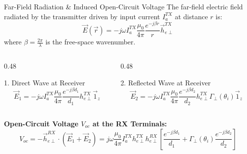 \documentclass[aspectratio=169, 10pt]{beamer}
\begin{document}
\begin{frame}{Far-Field Radiation \& Induced Open-Circuit Voltage}
    The far-field electric field radiated by the transmitter driven by input current $I_a^{TX}$ at distance $r$ is:
    \begin{equation}
        \vec{E}(\vec{r}) = -j\omega I_a^{TX} \frac{\mu_0}{4\pi} \frac{e^{-j\beta r}}{r} \vec{h}_{e\perp}^{TX}
    \end{equation}
    where $\beta = \frac{2\pi}{\lambda}$ is the free-space wavenumber.

    \begin{columns}[T]
        \begin{column}{0.48\textwidth}
            \begin{block}{1. Direct Wave at Receiver}
                \begin{equation}
                    \vec{E}_1 = -j\omega I_a^{TX} \frac{\mu_0}{4\pi} \frac{e^{-j\beta d_1}}{d_1} h_{e\perp}^{TX} \vec{1}_z
                \end{equation}
            \end{block}
        \end{column}
        \begin{column}{0.48\textwidth}
            \begin{block}{2. Reflected Wave at Receiver}
                \begin{equation}
                    \vec{E}_2 = -j\omega I_a^{TX} \frac{\mu_0}{4\pi} \frac{e^{-j\beta d_2}}{d_2} h_{e\perp}^{TX} \Gamma_\perp(\theta_i) \vec{1}_z
                \end{equation}
            \end{block}
        \end{column}
    \end{columns}

    \vspace{0.2cm}
    \textbf{Open-Circuit Voltage $V_{oc}$ at the RX Terminals:}
    \begin{equation}
        V_{oc} = -\vec{h}_{e\perp}^{RX} \cdot (\vec{E}_1 + \vec{E}_2) 
        = j\omega \frac{\mu_0}{4\pi} I_a^{TX} h_{e\perp}^{TX} h_{e\perp}^{RX} \left[ \frac{e^{-j\beta d_1}}{d_1} + \Gamma_\perp(\theta_i) \frac{e^{-j\beta d_2}}{d_2} \right]
    \end{equation}
\end{frame}
\end{document}
